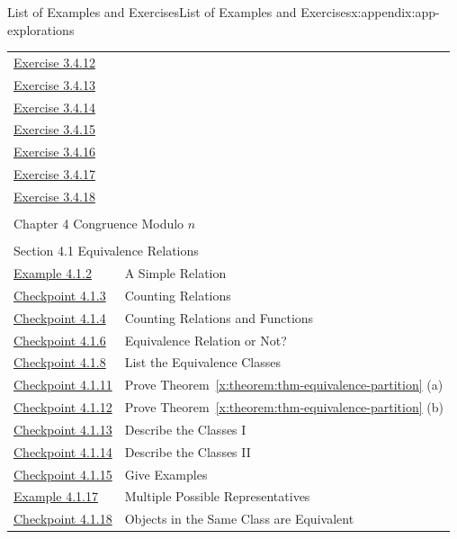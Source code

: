 \documentclass[oneside,10pt,]{book}
\newcommand{\xreffont}{\relax}
\numberwithin{equation}{section}
\begin{document}
\begin{appendixptx}{List of Examples and Exercises}{}{List of Examples and Exercises}{}{}{x:appendix:app-explorations}
\begin{longtable}[l]{ll}
\hyperlink{g:exercise:id531982}{Exercise 3.4.12}& \\
\hyperlink{g:exercise:id531974}{Exercise 3.4.13}& \\
\hyperlink{g:exercise:id532013}{Exercise 3.4.14}& \\
\hyperlink{g:exercise:id532030}{Exercise 3.4.15}& \\
\hyperlink{g:exercise:id532024}{Exercise 3.4.16}& \\
\hyperlink{g:exercise:id532080}{Exercise 3.4.17}& \\
\hyperlink{g:exercise:id532276}{Exercise 3.4.18}& \\
\multicolumn{2}{l}{\null}\\[1.5ex] \multicolumn{2}{l}{\large Chapter 4 Congruence Modulo \(n\)}\\[0.5ex]
\multicolumn{2}{l}{\null}\\[1.5ex] \multicolumn{2}{l}{\large Section 4.1 Equivalence Relations}\\[0.5ex]
\hyperref[x:example:eg-cong-relation]{Example 4.1.2}& A Simple Relation\\
\hyperref[x:exercise:ex-cong-relation-count]{Checkpoint 4.1.3}& Counting Relations\\
\hyperref[x:exercise:ex-cong-relation-count-2]{Checkpoint 4.1.4}& Counting Relations and Functions\\
\hyperref[x:exercise:ex-cong-equivalence-check]{Checkpoint 4.1.6}& Equivalence Relation or Not?\\
\hyperref[x:exercise:ex-cong-equivalence-class]{Checkpoint 4.1.8}& List the Equivalence Classes\\
\hyperref[x:exercise:ex-cong-equivalence-partition-proof-a]{Checkpoint 4.1.11}& Prove Theorem~{\xreffont\ref*{x:theorem:thm-equivalence-partition}} (a)\\
\hyperref[x:exercise:ex-cong-equivalence-partition-proof-b]{Checkpoint 4.1.12}& Prove Theorem~{\xreffont\ref*{x:theorem:thm-equivalence-partition}} (b)\\
\hyperref[x:exercise:ex-cong-equivalence-mod3]{Checkpoint 4.1.13}& Describe the Classes I\\
\hyperref[x:exercise:ex-cong-equivalence-largest]{Checkpoint 4.1.14}& Describe the Classes II\\
\hyperref[x:exercise:ex-cong-euivalence-example]{Checkpoint 4.1.15}& Give Examples\\
\hyperref[x:example:eg-cong-equivalence-even]{Example 4.1.17}& Multiple Possible Representatives\\
\hyperref[x:exercise:ex-cong-euivalence-prove-property]{Checkpoint 4.1.18}& Objects in the Same Class are Equivalent\\

\end{longtable}
\end{appendixptx}
\end{document}
